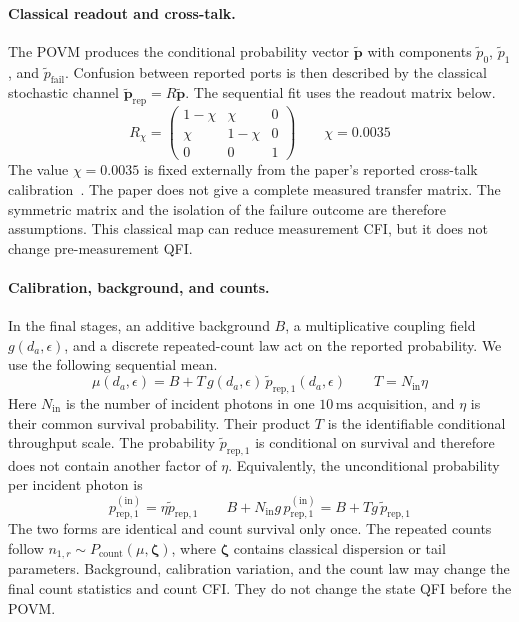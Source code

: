 \paragraph{Classical readout and cross-talk.}
The POVM produces the conditional probability vector $\widetilde{\boldsymbol p}$ with components $\widetilde{p}_0$, $\widetilde{p}_1$, and $\widetilde{p}_{\mathrm{fail}}$.  Confusion between reported ports is then described by the classical stochastic channel $\widetilde{\boldsymbol p}_{\mathrm{rep}}=R\widetilde{\boldsymbol p}$.  The sequential fit uses the readout matrix below.
\begin{equation}
    R_{\chi}=
    \begin{pmatrix}
        1-\chi & \chi   & 0 \\
        \chi   & 1-\chi & 0 \\
        0      & 0      & 1
    \end{pmatrix}
    \qquad \chi=0.0035
    \label{eq:spade_readout_matrix}
\end{equation}
The value $\chi=0.0035$ is fixed externally from the paper's reported cross-talk calibration~\cite{Santamaria2024single}.  The paper does not give a complete measured transfer matrix.  The symmetric matrix and the isolation of the failure outcome are therefore assumptions.  This classical map can reduce measurement CFI, but it does not change pre-measurement QFI.

\paragraph{Calibration, background, and counts.}
In the final stages, an additive background $B$, a multiplicative coupling field $g(d_a,\epsilon)$, and a discrete repeated-count law act on the reported probability.  We use the following sequential mean.
\begin{equation}
    \mu(d_a,\epsilon)
    =B+T\,g(d_a,\epsilon)\,\widetilde{p}_{\mathrm{rep},1}(d_a,\epsilon)
    \qquad
    T=N_{\mathrm{in}}\eta
    \label{eq:spade_count_channel}
\end{equation}
Here $N_{\mathrm{in}}$ is the number of incident photons in one $10\,\mathrm{ms}$ acquisition, and $\eta$ is their common survival probability. Their product $T$ is the identifiable conditional throughput scale. The probability $\widetilde{p}_{\mathrm{rep},1}$ is conditional on survival and therefore does not contain another factor of $\eta$. Equivalently, the unconditional probability per incident photon is
\begin{equation}
    p_{\mathrm{rep},1}^{(\mathrm{in})}
    =\eta\widetilde{p}_{\mathrm{rep},1}
    \qquad
    B+N_{\mathrm{in}}g\,p_{\mathrm{rep},1}^{(\mathrm{in})}
    =B+Tg\,\widetilde{p}_{\mathrm{rep},1}
    \label{eq:spade_conditional_unconditional_counts}
\end{equation}
The two forms are identical and count survival only once. The repeated counts follow $n_{1,r}\sim P_{\mathrm{count}}(\mu,\boldsymbol\zeta)$, where $\boldsymbol\zeta$ contains classical dispersion or tail parameters.  Background, calibration variation, and the count law may change the final count statistics and count CFI.  They do not change the state QFI before the POVM.

